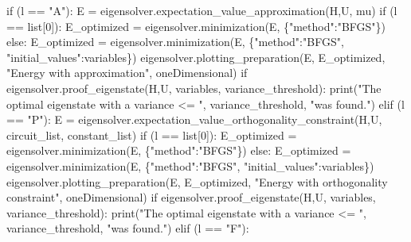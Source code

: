 \documentclass[
  letterpaper,
  DIV=11,
  numbers=noendperiod]{scrartcl}
\newenvironment{Shaded}{\begin{snugshade}}{\end{snugshade}}
\newcommand{\BuiltInTok}[1]{\textcolor[rgb]{0.00,0.23,0.31}{#1}}
\newcommand{\ControlFlowTok}[1]{\textcolor[rgb]{0.00,0.23,0.31}{#1}}
\newcommand{\DecValTok}[1]{\textcolor[rgb]{0.68,0.00,0.00}{#1}}
\newcommand{\NormalTok}[1]{\textcolor[rgb]{0.00,0.23,0.31}{#1}}
\newcommand{\OperatorTok}[1]{\textcolor[rgb]{0.37,0.37,0.37}{#1}}
\newcommand{\StringTok}[1]{\textcolor[rgb]{0.13,0.47,0.30}{#1}}
\begin{document}
\begin{Shaded}
\begin{Highlighting}[]
            \ControlFlowTok{if}\NormalTok{ (l }\OperatorTok{==} \StringTok{"A"}\NormalTok{):}
\NormalTok{                E }\OperatorTok{=}\NormalTok{ eigensolver.expectation\_value\_approximation(H,U, mu)}
                \ControlFlowTok{if}\NormalTok{ (l }\OperatorTok{==} \BuiltInTok{list}\NormalTok{[}\DecValTok{0}\NormalTok{]):}
\NormalTok{                    E\_optimized }\OperatorTok{=}\NormalTok{ eigensolver.minimization(E, \{}\StringTok{"method"}\NormalTok{:}\StringTok{"BFGS"}\NormalTok{\})}
                \ControlFlowTok{else}\NormalTok{: }
\NormalTok{                    E\_optimized }\OperatorTok{=}\NormalTok{ eigensolver.minimization(E, \{}\StringTok{"method"}\NormalTok{:}\StringTok{"BFGS"}\NormalTok{, }\StringTok{"initial\_values"}\NormalTok{:variables\})}
\NormalTok{                eigensolver.plotting\_preparation(E, E\_optimized, }\StringTok{"Energy with approximation"}\NormalTok{, oneDimensional)}
                \ControlFlowTok{if}\NormalTok{ eigensolver.proof\_eigenstate(H,U, variables, variance\_threshold):}
                        \BuiltInTok{print}\NormalTok{(}\StringTok{"The optimal eigenstate with a variance \textless{}= "}\NormalTok{, variance\_threshold, }\StringTok{"was found."}\NormalTok{)}
            \ControlFlowTok{elif}\NormalTok{ (l }\OperatorTok{==} \StringTok{"P"}\NormalTok{):}
\NormalTok{                E }\OperatorTok{=}\NormalTok{ eigensolver.expectation\_value\_orthogonality\_constraint(H,U, circuit\_list, constant\_list)}
                \ControlFlowTok{if}\NormalTok{ (l }\OperatorTok{==} \BuiltInTok{list}\NormalTok{[}\DecValTok{0}\NormalTok{]):}
\NormalTok{                    E\_optimized }\OperatorTok{=}\NormalTok{ eigensolver.minimization(E, \{}\StringTok{"method"}\NormalTok{:}\StringTok{"BFGS"}\NormalTok{\})}
                \ControlFlowTok{else}\NormalTok{: }
\NormalTok{                    E\_optimized }\OperatorTok{=}\NormalTok{ eigensolver.minimization(E, \{}\StringTok{"method"}\NormalTok{:}\StringTok{"BFGS"}\NormalTok{, }\StringTok{"initial\_values"}\NormalTok{:variables\})}
\NormalTok{                eigensolver.plotting\_preparation(E, E\_optimized, }\StringTok{"Energy with orthogonality constraint"}\NormalTok{, oneDimensional)}
                \ControlFlowTok{if}\NormalTok{ eigensolver.proof\_eigenstate(H,U, variables, variance\_threshold):}
                        \BuiltInTok{print}\NormalTok{(}\StringTok{"The optimal eigenstate with a variance \textless{}= "}\NormalTok{, variance\_threshold, }\StringTok{"was found."}\NormalTok{)}
            \ControlFlowTok{elif}\NormalTok{ (l }\OperatorTok{==} \StringTok{"F"}\NormalTok{):}

\end{Highlighting}
\end{Shaded}
\end{document}
